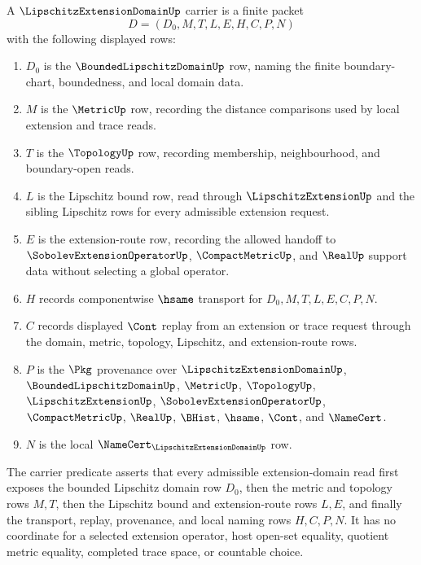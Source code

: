 \begin{definition}
\label{def:lipschitz-extension-domain-carrier}
A $\LipschitzExtensionDomainUp$ carrier is a finite packet
$$
D=(D_0,M,T,L,E,H,C,P,N)
$$
with the following displayed rows:
\begin{enumerate}
\item $D_0$ is the $\BoundedLipschitzDomainUp$ row, naming the finite boundary-chart, boundedness, and local domain data.
\item $M$ is the $\MetricUp$ row, recording the distance comparisons used by local extension and trace reads.
\item $T$ is the $\TopologyUp$ row, recording membership, neighbourhood, and boundary-open reads.
\item $L$ is the Lipschitz bound row, read through $\LipschitzExtensionUp$ and the sibling Lipschitz rows for every admissible extension request.
\item $E$ is the extension-route row, recording the allowed handoff to $\SobolevExtensionOperatorUp$, $\CompactMetricUp$, and $\RealUp$ support data without selecting a global operator.
\item $H$ records componentwise $\hsame$ transport for $D_0,M,T,L,E,C,P,N$.
\item $C$ records displayed $\Cont$ replay from an extension or trace request through the domain, metric, topology, Lipschitz, and extension-route rows.
\item $P$ is the $\Pkg$ provenance over $\LipschitzExtensionDomainUp$, $\BoundedLipschitzDomainUp$, $\MetricUp$, $\TopologyUp$, $\LipschitzExtensionUp$, $\SobolevExtensionOperatorUp$, $\CompactMetricUp$, $\RealUp$, $\BHist$, $\hsame$, $\Cont$, and $\NameCert$.
\item $N$ is the local $\NameCert_{\LipschitzExtensionDomainUp}$ row.
\end{enumerate}
The carrier predicate asserts that every admissible extension-domain read first exposes the bounded Lipschitz domain row $D_0$, then the metric and topology rows $M,T$, then the Lipschitz bound and extension-route rows $L,E$, and finally the transport, replay, provenance, and local naming rows $H,C,P,N$. It has no coordinate for a selected extension operator, host open-set equality, quotient metric equality, completed trace space, or countable choice.
\end{definition}

